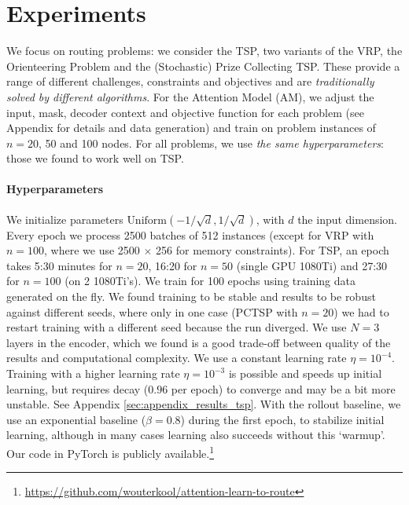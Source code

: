 \section{Experiments}
\label{sec:experiments}
We focus on routing problems: we consider the TSP, two variants of the VRP, the Orienteering Problem and the (Stochastic) Prize Collecting TSP. These provide a range of different challenges, constraints and objectives and are \emph{traditionally solved by different algorithms}. For the Attention Model (AM), we adjust the input, mask, decoder context and objective function for each problem (see Appendix for details and data generation) and train on problem instances of $n=20$, 50 and 100 nodes. For all problems, we use \emph{the same hyperparameters}: those we found to work well on TSP.

\paragraph{Hyperparameters}
We initialize parameters $\text{Uniform}(-1/{\sqrt{d}}, 1/{\sqrt{d}})$, with $d$ the input dimension. Every epoch we process 2500 batches of 512 instances (except for VRP with $n=100$, where we use 2500 $\times$ 256 for memory constraints). For TSP, an epoch takes 5:30 minutes for $n=20$, 16:20 for $n=50$ (single GPU 1080Ti) and 27:30 for $n=100$ (on 2 1080Ti's). We train for 100 epochs using training data generated on the fly. We found training to be stable and results to be robust against different seeds, where only in one case (PCTSP with $n=20$) we had to restart training with a different seed because the run diverged. We use $N=3$ layers in the encoder, which we found is a good trade-off between quality of the results and computational complexity. We use a constant learning rate $\eta = 10^{-4}$. Training with a higher learning rate $\eta = 10^{-3}$ is possible and speeds up initial learning, but requires decay ($0.96$ per epoch) to converge and may be a bit more unstable. See Appendix \ref{sec:appendix_results_tsp}. With the rollout baseline, we use an exponential baseline ($\beta = 0.8$) during the first epoch, to stabilize initial learning, although in many cases learning also succeeds without this `warmup'. Our code in PyTorch \citep{paszke2017automatic} is publicly available.\footnote{\url{https://github.com/wouterkool/attention-learn-to-route}}

